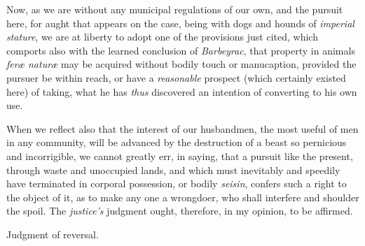 Now, as we are without any municipal regulations of our own, and the pursuit
here, for aught that appears on the case, being with dogs and hounds of
\textit{imperial stature}, we are at liberty to adopt one of the provisions just
cited, which comports also with the learned conclusion of \textit{Barbeyrac},
that property in animals \textit{fer{\ae} natur{\ae}} may be acquired without
bodily touch or manucaption, provided the pursuer be within reach, or have a
\textit{reasonable} prospect (which certainly existed here) of taking, what he
has \textit{thus} discovered an intention of converting to his own use.

When we reflect also that the interest of our husbandmen, the most useful of men
in any community, will be advanced by the destruction of a beast so pernicious
and incorrigible, we cannot greatly err, in saying, that a pursuit like the
present, through waste and unoccupied lands, and which must inevitably and
speedily have terminated in corporal possession, or bodily \textit{seisin},
confers such a right to the object of it, as to make any one a wrongdoer, who
shall interfere and shoulder the spoil. The \textit{justice's} judgment ought,
therefore, in my opinion, to be affirmed.

Judgment of reversal.

